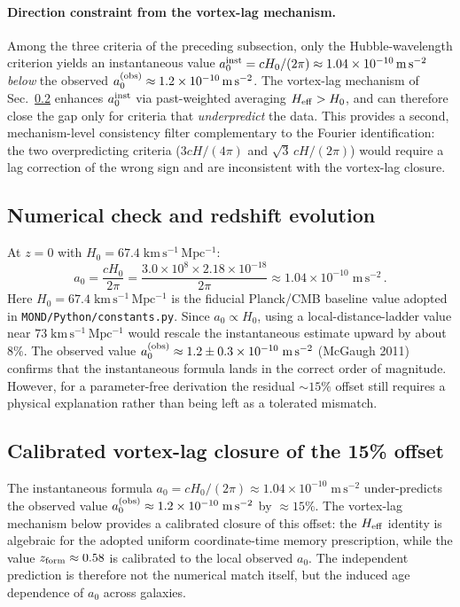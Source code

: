 \documentclass[11pt]{article}
\begin{document}
\paragraph{Direction constraint from the vortex-lag mechanism.}
Among the three criteria of the preceding subsection, only the Hubble-wavelength criterion yields an instantaneous value $a_0^{\rm inst}=cH_0/(2\pi)\approx 1.04\times10^{-10}\,\mathrm{m\,s^{-2}}$ \emph{below} the observed $a_0^{(\rm obs)}\approx 1.2\times10^{-10}\,\mathrm{m\,s^{-2}}$.  The vortex-lag mechanism of Sec.~\ref{sec:vortex_lag} enhances $a_0^{\rm inst}$ via past-weighted averaging $H_{\rm eff}>H_0$, and can therefore close the gap only for criteria that \emph{underpredict} the data.  This provides a second, mechanism-level consistency filter complementary to the Fourier identification: the two overpredicting criteria ($3cH/(4\pi)$ and $\sqrt{3}\,cH/(2\pi)$) would require a lag correction of the wrong sign and are inconsistent with the vortex-lag closure.

\subsection{Numerical check and redshift evolution}

At $z=0$ with $H_0=67.4\;\mathrm{km\,s^{-1}\,Mpc^{-1}}$:
\begin{equation}
a_0 = \frac{cH_0}{2\pi}
  = \frac{3.0\times 10^{8}\times 2.18\times 10^{-18}}{2\pi}
  \approx 1.04\times 10^{-10}\;\mathrm{m\,s^{-2}}\,.
\end{equation}
Here $H_0=67.4\;\mathrm{km\,s^{-1}\,Mpc^{-1}}$ is the fiducial Planck/CMB baseline value adopted in \texttt{MOND/Python/constants.py}. Since $a_0\propto H_0$, using a local-distance-ladder value near $73\;\mathrm{km\,s^{-1}\,Mpc^{-1}}$ would rescale the instantaneous estimate upward by about $8\%$.
The observed value $a_0^{(\rm obs)}\approx 1.2\pm 0.3\times 10^{-10}\;\mathrm{m\,s^{-2}}$ (McGaugh 2011) confirms that the instantaneous formula lands in the correct order of magnitude.  However, for a parameter-free derivation the residual $\sim15\%$ offset still requires a physical explanation rather than being left as a tolerated mismatch.

\subsection{Calibrated vortex-lag closure of the 15\% offset}\label{sec:vortex_lag}

The instantaneous formula $a_0 = cH_0/(2\pi) \approx 1.04\times10^{-10}\;\mathrm{m\,s^{-2}}$ under-predicts the observed value $a_0^{(\rm obs)}\approx 1.2\times10^{-10}\;\mathrm{m\,s^{-2}}$ by $\approx 15\%$.  The vortex-lag mechanism below provides a calibrated closure of this offset: the $H_{\rm eff}$ identity is algebraic for the adopted uniform coordinate-time memory prescription, while the value $z_{\rm form}\approx0.58$ is calibrated to the local observed $a_0$.  The independent prediction is therefore not the numerical match itself, but the induced age dependence of $a_0$ across galaxies.
\end{document}
